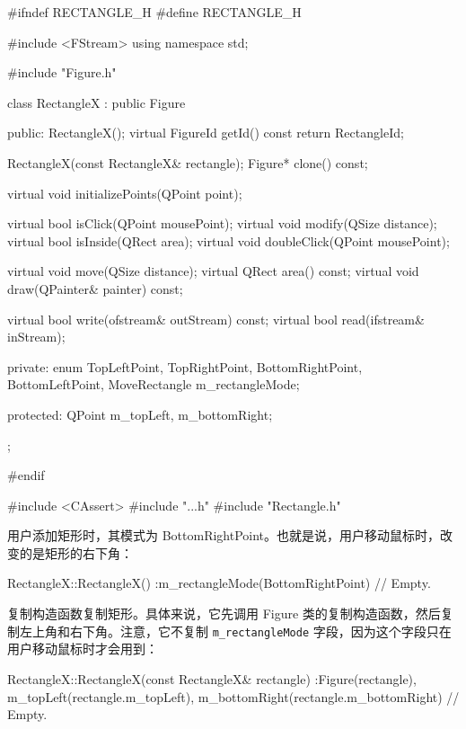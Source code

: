 \medskip{}

\begin{codebox}
#ifndef RECTANGLE_H
#define RECTANGLE_H

#include <FStream>
using namespace std;

#include "Figure.h"

class RectangleX : public Figure {
  public:
  RectangleX();
  virtual FigureId getId() const {return RectangleId;}

  RectangleX(const RectangleX& rectangle);
  Figure* clone() const;

  virtual void initializePoints(QPoint point);

  virtual bool isClick(QPoint mousePoint);
  virtual void modify(QSize distance);
  virtual bool isInside(QRect area);
  virtual void doubleClick(QPoint mousePoint);

  virtual void move(QSize distance);
  virtual QRect area() const;
  virtual void draw(QPainter& painter) const;

  virtual bool write(ofstream& outStream) const;
  virtual bool read(ifstream& inStream);

  private:
    enum {TopLeftPoint, TopRightPoint, BottomRightPoint,
        BottomLeftPoint, MoveRectangle} m_rectangleMode;

  protected:
    QPoint m_topLeft, m_bottomRight;
};

#endif
\end{codebox}

\medskip{}

\begin{codebox}
#include <CAssert>
#include "..\MainWindow\DocumentWidget.h"
#include "Rectangle.h"
\end{codebox}

用户添加矩形时，其模式为 BottomRightPoint。也就是说，用户移动鼠标时，改变的是矩形的右下角：

\begin{codebox}
RectangleX::RectangleX()
:m_rectangleMode(BottomRightPoint) {
  // Empty.
}
\end{codebox}

复制构造函数复制矩形。具体来说，它先调用 Figure 类的复制构造函数，然后复制左上角和右下角。注意，它不复制 \texttt{m\_rectangleMode} 字段，因为这个字段只在用户移动鼠标时才会用到：

\begin{codebox}
RectangleX::RectangleX(const RectangleX& rectangle)
:Figure(rectangle),
  m_topLeft(rectangle.m_topLeft),
  m_bottomRight(rectangle.m_bottomRight) {
  // Empty.
}
\end{codebox}

